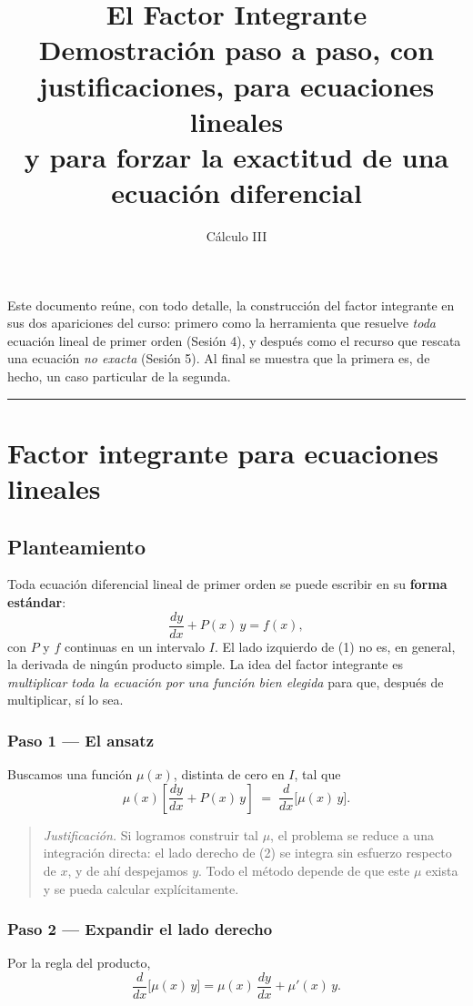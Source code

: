 \documentclass[12pt,letterpaper]{article}
\title{\textbf{El Factor Integrante}\\[4pt]
\large Demostración paso a paso, con justificaciones, para ecuaciones lineales\\ y para forzar la exactitud de una ecuación diferencial}
\author{Cálculo III}
\date{}
\newcommand{\justif}[1]{%
  \par\noindent
  {\small\color{JustifColor}%
  \begin{quote}
  \textit{Justificación.} #1
  \end{quote}}%
}
\newcommand{\paso}[1]{\subsubsection*{#1}}
\begin{document}
\maketitle
\thispagestyle{empty}

\noindent
Este documento reúne, con todo detalle, la construcción del factor integrante
en sus dos apariciones del curso: primero como la herramienta que resuelve
\emph{toda} ecuación lineal de primer orden (Sesión 4), y después como el
recurso que rescata una ecuación \emph{no exacta} (Sesión 5). Al final se
muestra que la primera es, de hecho, un caso particular de la segunda.

\tableofcontents

\bigskip
\hrule
\bigskip

\section{Factor integrante para ecuaciones lineales}

\subsection*{Planteamiento}

Toda ecuación diferencial lineal de primer orden se puede escribir en su
\textbf{forma estándar}:
\begin{equation}
\frac{dy}{dx} + P(x)\,y = f(x), \tag{1}
\end{equation}
con $P$ y $f$ continuas en un intervalo $I$. El lado izquierdo de (1) no es,
en general, la derivada de ningún producto simple. La idea del factor
integrante es \emph{multiplicar toda la ecuación por una función bien
elegida} para que, después de multiplicar, sí lo sea.

\paso{Paso 1 --- El ansatz}

Buscamos una función $\mu(x)$, distinta de cero en $I$, tal que
\begin{equation}
\mu(x)\left[\frac{dy}{dx} + P(x)\,y\right] \;=\; \frac{d}{dx}\Big[\mu(x)\,y\Big]. \tag{2}
\end{equation}

\justif{Si logramos construir tal $\mu$, el problema se reduce a una
integración directa: el lado derecho de (2) se integra sin esfuerzo respecto
de $x$, y de ahí despejamos $y$. Todo el método depende de que este $\mu$
exista y se pueda calcular explícitamente.}

\paso{Paso 2 --- Expandir el lado derecho}

Por la regla del producto,
\begin{equation}
\frac{d}{dx}\big[\mu(x)\,y\big] = \mu(x)\,\frac{dy}{dx} + \mu'(x)\,y. \tag{3}
\end{equation}
\end{document}
